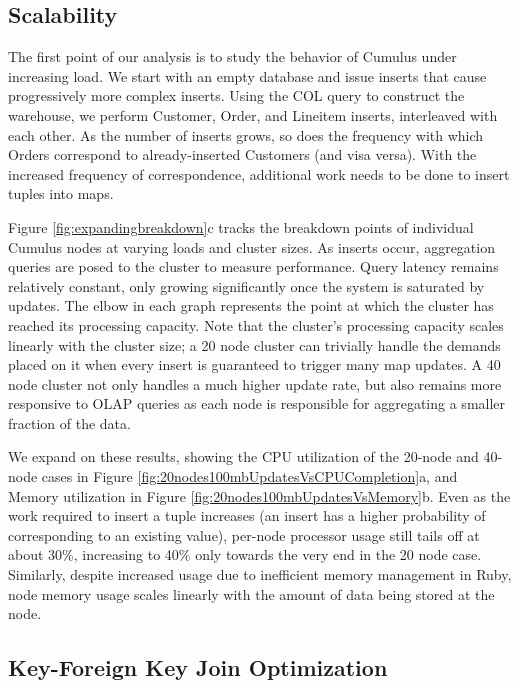 \subsection{Scalability}

The first point of our analysis is to study the behavior of Cumulus under increasing load.  We start with an empty database and issue inserts that cause progressively more complex inserts.  Using the COL query to construct the warehouse, we perform Customer, Order, and Lineitem inserts, interleaved with each other.  As the number of inserts grows, so does the frequency with which Orders correspond to already-inserted Customers (and visa versa).  With the increased frequency of correspondence, additional work needs to be done to insert tuples into maps.  

Figure \ref{fig:expandingbreakdown}c tracks the breakdown points of individual Cumulus nodes at varying loads and cluster sizes.  As inserts occur, aggregation queries are posed to the cluster to measure performance.  Query latency remains relatively constant, only growing significantly once the system is saturated by updates.  The elbow in each graph represents the point at which the cluster has reached its processing capacity.  Note that the cluster's processing capacity scales linearly with the cluster size; a 20 node cluster can trivially handle the demands placed on it when every insert is guaranteed to trigger many map updates.  A 40 node cluster not only handles a much higher update rate, but also remains more responsive to OLAP queries as each node is responsible for aggregating a smaller fraction of the data.

We expand on these results, showing the CPU utilization of the 20-node and 40-node cases in Figure \ref{fig:20nodes100mbUpdatesVsCPUCompletion}a, and Memory utilization in Figure \ref{fig:20nodes100mbUpdatesVsMemory}b.  Even as the work required to insert a tuple increases (an insert has a higher probability of corresponding to an existing value), per-node processor usage still tails off at about 30\%, increasing to 40\% only towards the very end in the 20 node case.  Similarly, despite increased usage due to inefficient memory management in Ruby, node memory usage scales linearly with the amount of data being stored at the node.  



\subsection{Key-Foreign Key Join Optimization}
\label{sec:key_fkey}

